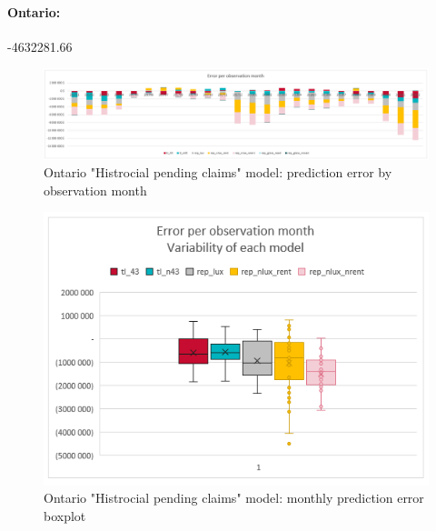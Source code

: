 	\paragraph{Ontario:}
		-4632281.66
		\begin{figure}[H]
			\begin{center}
				\includegraphics[scale=0.2]{Graphiques/ON_current_model_by_month} 
				\renewcommand{\figurename}{Figure}
				\caption{Ontario "Histrocial pending claims" model: prediction error by observation month}\label{Fig_ON_current_er_by_month}
			\end{center}
		\end{figure}
		\begin{figure}[H]
			\begin{center}
				\includegraphics[scale=0.2]{Graphiques/ON_current_model_mustach} 
				\renewcommand{\figurename}{Figure}
				\caption{Ontario "Histrocial pending claims" model: monthly prediction error boxplot}\label{Fig_ON_current_er_boxplot}
			\end{center}
		\end{figure}
